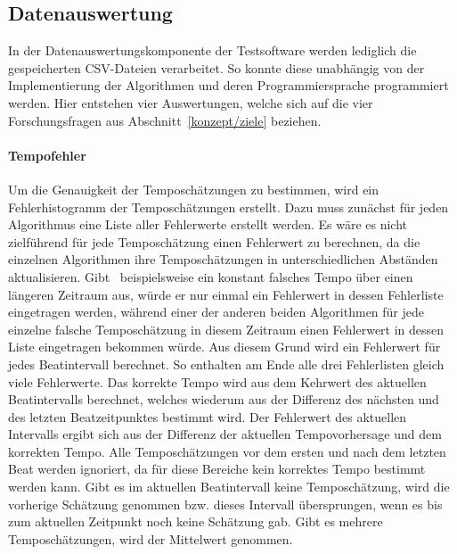 {	\subsection{Datenauswertung}
	{
		In der Datenauswertungskomponente der Testsoftware werden lediglich die gespeicherten \acs{CSV}-Dateien verarbeitet.
		So konnte diese unabhängig von der Implementierung der Algorithmen und deren Programmiersprache programmiert werden.
		Hier entstehen vier Auswertungen,
			welche sich auf die vier Forschungsfragen aus Abschnitt~\ref{konzept/ziele} beziehen.

		\paragraph{Tempofehler}
		{
			Um die Genauigkeit der Temposchätzungen zu bestimmen,
				wird ein Fehlerhistogramm der Temposchätzungen erstellt.
			Dazu muss zunächst für jeden Algorithmus eine Liste aller Fehlerwerte erstellt werden.
			Es wäre es nicht zielführend für jede Temposchätzung einen Fehlerwert zu berechnen,
				da die einzelnen Algorithmen ihre Temposchätzungen in unterschiedlichen Abständen aktualisieren.
			Gibt~\cite{2011_PlRoSt} beispielsweise ein konstant falsches Tempo über einen längeren Zeitraum aus,
				würde er nur einmal ein Fehlerwert in dessen Fehlerliste eingetragen werden,
				während einer der anderen beiden Algorithmen
				für jede einzelne falsche Temposchätzung in diesem Zeitraum
				einen Fehlerwert in dessen Liste eingetragen bekommen würde.
			Aus diesem Grund wird ein Fehlerwert für jedes Beatintervall berechnet.
			So enthalten am Ende alle drei Fehlerlisten gleich viele Fehlerwerte.
			Das korrekte Tempo wird aus dem Kehrwert des aktuellen Beatintervalls berechnet,
				welches wiederum aus der Differenz des nächsten und des letzten Beatzeitpunktes bestimmt wird.
			Der Fehlerwert des aktuellen Intervalls ergibt sich aus der Differenz der aktuellen Tempovorhersage und dem korrekten Tempo.
			Alle Temposchätzungen vor dem ersten und nach dem letzten Beat werden ignoriert,
				da für diese Bereiche kein korrektes Tempo bestimmt werden kann.
			Gibt es im aktuellen Beatintervall keine Temposchätzung,
				wird die vorherige Schätzung genommen
				bzw. dieses Intervall übersprungen,
				wenn es bis zum aktuellen Zeitpunkt noch keine Schätzung gab.
			Gibt es mehrere Temposchätzungen,
				wird der Mittelwert genommen.

}}}
